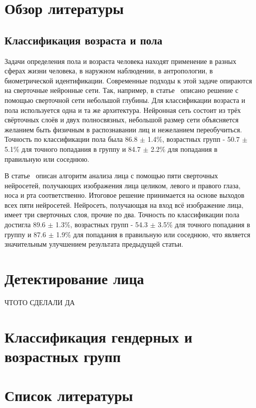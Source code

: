 \documentclass[a4paper,14pt]{extarticle}
\begin{document}
    \section{Обзор литературы}\label{sec:обзор-литературы}

    \subsection{Классификация возраста и пола}\label{subsec:классификация-возраста-и-пола}
    \par Задачи определения пола и возраста человека находят применение в разных сферах жизни человека, в наружном наблюдении, в антропологии, в биометрической идентификации.
    Современные подходы к этой задаче опираются на сверточные нейронные сети.
    Так, например, в статье~\cite{hassner} описано решение с помощью сверточной сети небольшой глубины.
    Для классификации возраста и пола используется одна и та же архитектура.
    Нейронная сеть состоит из трёх свёрточных слоёв и двух полносвязных, небольшой размер сети объясняется желанием быть физичным в распознавании лиц и нежеланием переобучиться.
    Точность по классификации пола была 86.8 $\pm$ 1.4\%, возрастных групп - 50.7 $\pm$ 5.1\% для точного попадания в группу и 84.7 $\pm$ 2.2\% для попадания в правильную или соседнюю.
    \par В статье~\cite{INDIA} описан алгоритм анализа лица с помощью пяти сверточных нейросетей, получающих изображения лица целиком, левого и правого глаза, носа и рта соответственно.
    Итоговое решение принимается на основе выходов всех пяти нейросетей.
    Нейросеть, получающая на вход всё изображение лица, имеет три сверточных слоя, прочие по два.
    Точность по классификации пола достигла 89.6 $\pm$ 1.3\%, возрастных групп - 54.3 $\pm$ 3.5\% для точного попадания в группу и 87.6 $\pm$ 1.9\% для попадания в правильную или соседнюю, что является значительным улучшением результата предыдущей статьи.
    \newpage


    \section{Детектирование лица}\label{sec:детектирование-лица}
    ЧТОТО СДЕЛАЛИ ДА
    \newpage


    \section{Классификация гендерных и возрастных групп}\label{sec:классификация-гендерных-и-возрастных-групп}
    


    \section{Список литературы}\label{sec:список-литературы}
    
\end{document}
